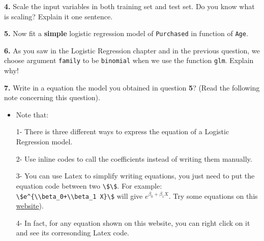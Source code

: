 \documentclass[]{book}
\newenvironment{Shaded}{\begin{snugshade}}{\end{snugshade}}
\newcommand{\KeywordTok}[1]{\textcolor[rgb]{0.13,0.29,0.53}{\textbf{#1}}}
\newcommand{\DataTypeTok}[1]{\textcolor[rgb]{0.13,0.29,0.53}{#1}}
\newcommand{\DecValTok}[1]{\textcolor[rgb]{0.00,0.00,0.81}{#1}}
\newcommand{\FloatTok}[1]{\textcolor[rgb]{0.00,0.00,0.81}{#1}}
\newcommand{\StringTok}[1]{\textcolor[rgb]{0.31,0.60,0.02}{#1}}
\newcommand{\CommentTok}[1]{\textcolor[rgb]{0.56,0.35,0.01}{\textit{#1}}}
\newcommand{\OtherTok}[1]{\textcolor[rgb]{0.56,0.35,0.01}{#1}}
\newcommand{\OperatorTok}[1]{\textcolor[rgb]{0.81,0.36,0.00}{\textbf{#1}}}
\newcommand{\NormalTok}[1]{#1}
\newenvironment{rmdblock}[1]
  {\begin{shaded*}
  \begin{itemize}
  \renewcommand{\labelitemi}{
    \raisebox{-.7\height}[0pt][0pt]{
      {\setkeys{Gin}{width=2em,keepaspectratio}\texttt{[image: img/icons/\#1]}}
    }
  }
  \item
  }
  {
  \end{itemize}
  \end{shaded*}
  }
\newenvironment{rmdtip}
  {\begin{rmdblock}{tip}}
  {\end{rmdblock}}
\theoremstyle{definition}
\theoremstyle{definition}
\theoremstyle{definition}
\theoremstyle{remark}
\begin{document}
\begin{Shaded}
\end{Shaded}

\textbf{4.} Scale the input variables in both training set and test set.
Do you know what is scaling? Explain it one sentence.

\textbf{5.} Now fit a \textbf{simple} logistic regression model of
\texttt{Purchased} in function of \texttt{Age}.

\textbf{6.} As you saw in the Logistic Regression chapter and in the
previous question, we choose argument \texttt{family} to be
\texttt{binomial} when we use the function \texttt{glm}. Explain why!

\textbf{7.} Write in a equation the model you obtained in question
\textbf{5}? (Read the following note concerning this question).

\begin{rmdtip}
Note that:

1- There is three different ways to express the equation of a Logistic
Regression model.

2- Use inline codes to call the coefficients instead of writing them
manually.

3- You can use Latex to simplify writing equations, you just need to put
the equation code between two
\texttt{\textbackslash{}\$\textbackslash{}\$}. For example:
\texttt{\textbackslash{}\$e\^{}\{\textbackslash{}\textbackslash{}beta\_0+\textbackslash{}\textbackslash{}beta\_1\ X\}\textbackslash{}\$}
will give \(e^{\beta_0+\beta_1 X}\). Try some equations on this
\href{https://www.codecogs.com/latex/eqneditor.php}{website}).

4- In fact, for any equation shown on this website, you can right click
on it and see its corresonding Latex code.
\end{rmdtip}
\end{document}
